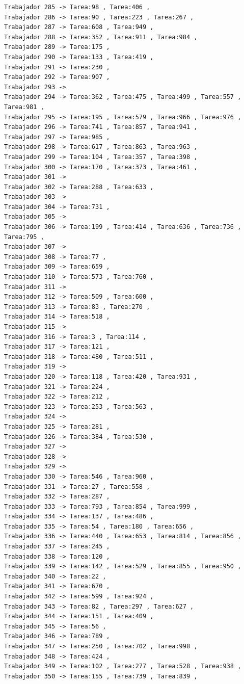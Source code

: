 \documentclass{article}
\begin{document}
\begin{lstlisting}
Trabajador 285 -> Tarea:98 , Tarea:406 , 
Trabajador 286 -> Tarea:90 , Tarea:223 , Tarea:267 , 
Trabajador 287 -> Tarea:608 , Tarea:949 , 
Trabajador 288 -> Tarea:352 , Tarea:911 , Tarea:984 , 
Trabajador 289 -> Tarea:175 , 
Trabajador 290 -> Tarea:133 , Tarea:419 , 
Trabajador 291 -> Tarea:230 , 
Trabajador 292 -> Tarea:907 , 
Trabajador 293 -> 
Trabajador 294 -> Tarea:362 , Tarea:475 , Tarea:499 , Tarea:557 , Tarea:981 , 
Trabajador 295 -> Tarea:195 , Tarea:579 , Tarea:966 , Tarea:976 , 
Trabajador 296 -> Tarea:741 , Tarea:857 , Tarea:941 , 
Trabajador 297 -> Tarea:985 , 
Trabajador 298 -> Tarea:617 , Tarea:863 , Tarea:963 , 
Trabajador 299 -> Tarea:104 , Tarea:357 , Tarea:398 , 
Trabajador 300 -> Tarea:170 , Tarea:373 , Tarea:461 , 
Trabajador 301 -> 
Trabajador 302 -> Tarea:288 , Tarea:633 , 
Trabajador 303 -> 
Trabajador 304 -> Tarea:731 , 
Trabajador 305 -> 
Trabajador 306 -> Tarea:199 , Tarea:414 , Tarea:636 , Tarea:736 , Tarea:795 , 
Trabajador 307 -> 
Trabajador 308 -> Tarea:77 , 
Trabajador 309 -> Tarea:659 , 
Trabajador 310 -> Tarea:573 , Tarea:760 , 
Trabajador 311 -> 
Trabajador 312 -> Tarea:509 , Tarea:600 , 
Trabajador 313 -> Tarea:83 , Tarea:270 , 
Trabajador 314 -> Tarea:518 , 
Trabajador 315 -> 
Trabajador 316 -> Tarea:3 , Tarea:114 , 
Trabajador 317 -> Tarea:121 , 
Trabajador 318 -> Tarea:480 , Tarea:511 , 
Trabajador 319 -> 
Trabajador 320 -> Tarea:118 , Tarea:420 , Tarea:931 , 
Trabajador 321 -> Tarea:224 , 
Trabajador 322 -> Tarea:212 , 
Trabajador 323 -> Tarea:253 , Tarea:563 , 
Trabajador 324 -> 
Trabajador 325 -> Tarea:281 , 
Trabajador 326 -> Tarea:384 , Tarea:530 , 
Trabajador 327 -> 
Trabajador 328 -> 
Trabajador 329 -> 
Trabajador 330 -> Tarea:546 , Tarea:960 , 
Trabajador 331 -> Tarea:27 , Tarea:558 , 
Trabajador 332 -> Tarea:287 , 
Trabajador 333 -> Tarea:793 , Tarea:854 , Tarea:999 , 
Trabajador 334 -> Tarea:137 , Tarea:486 , 
Trabajador 335 -> Tarea:54 , Tarea:180 , Tarea:656 , 
Trabajador 336 -> Tarea:440 , Tarea:653 , Tarea:814 , Tarea:856 , 
Trabajador 337 -> Tarea:245 , 
Trabajador 338 -> Tarea:120 , 
Trabajador 339 -> Tarea:142 , Tarea:529 , Tarea:855 , Tarea:950 , 
Trabajador 340 -> Tarea:22 , 
Trabajador 341 -> Tarea:670 , 
Trabajador 342 -> Tarea:599 , Tarea:924 , 
Trabajador 343 -> Tarea:82 , Tarea:297 , Tarea:627 , 
Trabajador 344 -> Tarea:151 , Tarea:409 , 
Trabajador 345 -> Tarea:56 , 
Trabajador 346 -> Tarea:789 , 
Trabajador 347 -> Tarea:250 , Tarea:702 , Tarea:998 , 
Trabajador 348 -> Tarea:424 , 
Trabajador 349 -> Tarea:102 , Tarea:277 , Tarea:528 , Tarea:938 , 
Trabajador 350 -> Tarea:155 , Tarea:739 , Tarea:839 , 

\end{lstlisting}
\end{document}

